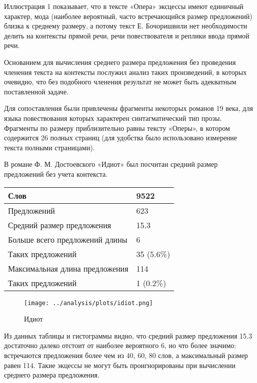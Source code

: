 \documentclass{kursa4}
\begin{document}
{        {Иллюстрация 1 показывает, что в тексте «Опера»
        эксцессы имеют единичный характер, мода (наиболее вероятный, часто
        встречающийся размер предложений) близка к среднему размеру, а потому
        текст Е. Бочоришвили нет необходимости делить на контексты прямой речи,
        речи повествователя и реплики ввода прямой речи. }

        {Основанием для вычисления среднего размера
        предложения без проведения членения текста на контексты послужил
        анализ таких произведений, в которых очевидно, что без подобного
        членения результат не может быть адекватным поставленной задаче. }

        Для сопоставления были привлечены фрагменты
        некоторых романов 19 века, для языка повествования которых характерен
        синтагматический тип прозы. Фрагменты по размеру приблизительно равны
        тексту «Оперы», в котором содержится 26 полных страниц (для удобства
        было использовано измерение текста полными страницами).

        В романе Ф. М. Достоевского «Идиот» был посчитан
        средний размер предложений без учета контекста. 

        \begin{center}
        \tablehead{}
        \begin{tabular}{|m{5.7730002cm}|m{1.6559999cm}|}
          \hline
          Слов &
          9522\\\hline
          Предложений &
          623\\\hline
          Средний размер предложения &
          15.3\\\hline
          Больше всего предложений длины &
          6\\\hline
          Таких предложений &
          35 (5.6\%)\\\hline
          Максимальная длина предложения &
          114\\\hline
          Таких предложений &
          1 (0.2\%)\\\hline
        \end{tabular}
        \end{center}

        \begin{figure}[htbp]
          \centering
          \texttt{[image: ../analysis/plots/idiot.png]}
          \caption{Идиот}
        \end{figure}
        

        Из данных таблицы и гистограммы видно, что средний размер предложения 15.3 достаточно далеко отстоит от наиболее вероятного 6, но что более значимо: встречаются предложения более чем из 40, 60, 80 слов, а максимальный размер равен 114. Такие экцессы не
        могут быть проигнорированы при вычислении среднего размера предложения.

}
\end{document}
